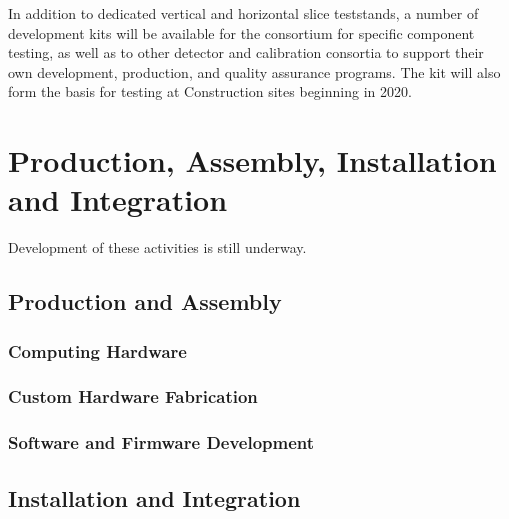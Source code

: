 In addition to dedicated vertical and horizontal slice teststands, a number of
 development kits will be available for the consortium for
specific component testing, as well as to other detector and
calibration consortia to support their own development, production, and quality assurance programs. The  
kit will also form the basis for testing at  Construction sites beginning in 2020. 


\section{Production, Assembly, Installation and Integration}
\label{sec:sp-daq:production}

Development of these activities is still underway.

\subsection{Production and Assembly}

\subsubsection{Computing Hardware}

\subsubsection{Custom Hardware Fabrication}

\subsubsection{Software and Firmware Development}

\subsection{Installation and Integration}



